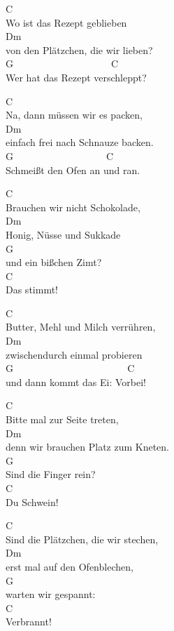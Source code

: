 \documentclass[
  letterpaper,
]{scrbook}
\begin{document}
C\\
Wo ist das Rezept geblieben\\
Dm\\
von den Plätzchen, die wir lieben?\\
G ~ ~ ~ ~ ~ ~ ~ ~ ~ ~ ~ ~C\\
Wer hat das Rezept verschleppt?

C\\
Na, dann müssen wir es packen,\\
Dm\\
einfach frei nach Schnauze backen. ~ ~ ~ ~ ~ ~ ~ ~ ~ ~ ~\\
G ~ ~ ~ ~ ~ ~ ~ ~ ~ ~ ~ C\\
Schmeißt den Ofen an und ran.

C\\
Brauchen wir nicht Schokolade,\\
Dm\\
Honig, Nüsse und Sukkade ~ ~ ~ ~ ~ ~ ~ ~ ~ ~ ~ ~ ~ ~ ~ ~\\
G\\
und ein bißchen Zimt?\\
C\\
Das stimmt!

C\\
Butter, Mehl und Milch verrühren,\\
Dm\\
zwischendurch einmal probieren ~ ~ ~ ~ ~ ~ ~ ~ ~\\
G ~ ~ ~ ~ ~ ~ ~ ~ ~ ~ ~ ~ ~ ~C\\
und dann kommt das Ei: Vorbei!

C\\
Bitte mal zur Seite treten,\\
Dm\\
denn wir brauchen Platz zum Kneten. ~ ~ ~ ~ ~ ~ ~ ~ ~ ~\\
G\\
Sind die Finger rein?\\
C\\
Du Schwein!

C\\
Sind die Plätzchen, die wir stechen,\\
Dm\\
erst mal auf den Ofenblechen, ~ ~ ~ ~ ~ ~ ~ ~ ~ ~ ~ ~ ~\\
G\\
warten wir gespannt:\\
C\\
Verbrannt!
\end{document}
